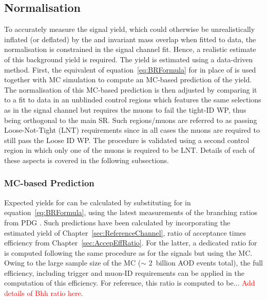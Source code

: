 \subsection{\Bhh Normalisation}
\label{subsec:BhhNormalisation}

To accurately measure the \Bd signal yield, which could otherwise be unrealistically inflated (or deflated) by the \Bhh and \Bdmumu invariant mass overlap when fitted to data, the \Bhh normalisation is constrained in the signal channel fit.
Hence, a realistic estimate of this background yield is required.
The yield is estimated using a data-driven method. 
First, the equivalent of equation~\ref{eq:BRFormula} for \Bhh in place of \Bmumu is used together with \Bhh MC simulation to compute an MC-based prediction of the \Bhh yield. 
The normalisation of this MC-based prediction is then adjusted by comparing it to a fit to data in an unblinded control regions which features the same selections as in the signal channel but requires the muons to fail the tight-ID WP, thus being orthogonal to the main SR. 
Such regions/muons are referred to as passing Loose-Not-Tight (LNT) requirements since in all cases the muons are required to still pass the Loose ID WP. 
The procedure is validated using a second control region in which only one of the muons is required to be LNT. 
Details of each of these aspects is covered in the following subsections. 

\subsubsection{MC-based Prediction}
\label{subsubsec:MCbasedBhh}

Expected yields for \Bhh can be calculated by substituting \Bhh for \Bmumu in equation~\ref{eq:BRFormula}, using the latest measurements of the \Bhh branching ratios from PDG \cite{ParticleDataGroup:2024cfk}. 
Such predictions have been calculated by incorporating the estimated \Bpm  yield of Chapter~\ref{sec:ReferenceChannel}, ratio of acceptance times efficiency from Chapter~\ref{sec:AccepEffRatio}.
For the latter, a dedicated ratio for \Bhh is computed following the same procedure as for the \Bmumu signals but using the \Bhh MC.
Owing to the large sample size of the \Bhh MC ($\sim$ 2~billion AOD events total), the full efficiency, including trigger and muon-ID requirements can be applied in the computation of this efficiency. 
For reference, this ratio is computed to be... \textcolor{red}{Add details of Bhh ratio here}.   

